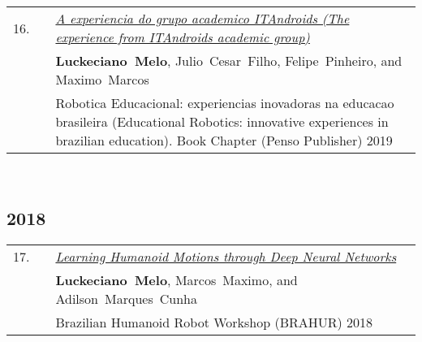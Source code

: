 \documentclass[11pt,letter,sans,colorlinks,linkcolor=true]{moderncv}
\begin{document}
\begin{minipage}{\textwidth}
\begin{tabular}{R{8mm}p{1mm}L{6.5in}}
 16.\hspace*{1mm} && \textit{\href{https://tinyurl.com/3b92dzjz}{A experiencia do grupo academico ITAndroids (The experience from ITAndroids academic group)} }  \\
 && \mbox{\textbf{Luckeciano Melo}}, \mbox{Julio Cesar Filho}, \mbox{Felipe Pinheiro}, and \mbox{Maximo Marcos} \\
 && Robotica Educacional: experiencias inovadoras na educacao brasileira (Educational Robotics: innovative experiences in brazilian education). Book Chapter (Penso Publisher) 2019  \\
\end{tabular} \\[2mm]
\end{minipage}
\subsection{2018}

\begin{minipage}{\textwidth}
\begin{tabular}{R{8mm}p{1mm}L{6.5in}}
 17.\hspace*{1mm} && \textit{\href{https://arxiv.org/abs/1901.00270}{Learning Humanoid Motions through Deep Neural Networks} }  \\
 && \mbox{\textbf{Luckeciano Melo}}, \mbox{Marcos Maximo}, and \mbox{Adilson Marques Cunha} \\
 && Brazilian Humanoid Robot Workshop (BRAHUR) 2018  \\
\end{tabular} \\[2mm]
\end{minipage}
\end{document}
